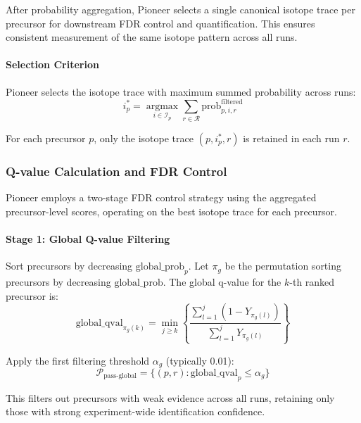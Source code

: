 \documentclass[pdflatex,sn-nature]{sn-jnl}
\begin{document}
After probability aggregation, Pioneer selects a single canonical isotope trace per precursor for downstream FDR control and quantification. This ensures consistent measurement of the same isotope pattern across all runs.

\paragraph{Selection Criterion}\label{para:selection-criterion} Pioneer selects the isotope trace with maximum summed probability across runs:
\begin{equation}
  i^*_{p} = \underset{i \in \mathcal{I}_p}{\operatorname{argmax}} \sum_{r \in \mathcal{R}} \text{prob}_{p,i,r}^{\text{filtered}}
\end{equation}

For each precursor $p$, only the isotope trace $(p, i^*_p, r)$ is retained in each run $r$.

\subsubsection{Q-value Calculation and FDR Control}\label{subsubsec:qvalue-calculation-fdr-control}

Pioneer employs a two-stage FDR control strategy using the aggregated precursor-level scores, operating on the best isotope trace for each precursor.

\paragraph{Stage 1: Global Q-value Filtering}\label{para:stage1-global-qvalue-filtering} Sort precursors by decreasing $\text{global\_prob}_p$. Let $\pi_g$ be the permutation sorting precursors by decreasing $\text{global\_prob}$. The global q-value for the $k$-th ranked precursor is:
\begin{equation}
  \text{global\_qval}_{\pi_g(k)} = \min_{j \geq k} \left\{ \frac{\sum_{l=1}^{j} (1 - Y_{\pi_g(l)})}{\sum_{l=1}^{j} Y_{\pi_g(l)}} \right\}
\end{equation}

Apply the first filtering threshold $\alpha_g$ (typically 0.01):
\begin{equation}
  \mathcal{P}_{\text{pass-global}} = \{(p,r) : \text{global\_qval}_p \leq \alpha_g\}
\end{equation}

This filters out precursors with weak evidence across all runs, retaining only those with strong experiment-wide identification confidence.
\end{document}
